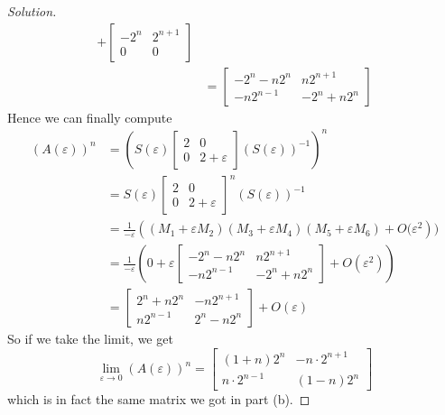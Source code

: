 \documentclass{article}
\newcommand{\ep}{{\varepsilon}}
\begin{document}
\begin{enumerate}
\begin{proof}[Solution]
\begin{align*}
			+ \begin{bmatrix} -2^n & 2^{n+1} \\ 0 & 0 \end{bmatrix}\\
			&= \begin{bmatrix} -2^n-n2^n & n2^{n+1} \\ -n2^{n-1} & -2^n + n2^n \end{bmatrix}
		\end{align*}
		Hence we can finally compute
		\begin{align*}
			(A(\ep))^n
			&= \left(S(\ep)\begin{bmatrix} 2 & 0 \\ 0 & 2 + \ep \end{bmatrix}
			(S(\ep))^{-1}\right)^n\\
			&= S(\ep)\begin{bmatrix} 2 & 0 \\ 0 & 2 + \ep \end{bmatrix}^n
			(S(\ep))^{-1}\\
			&= \frac{1}{-\ep}\left((M_1 + \ep M_2)(M_3 + \ep M_4)(M_5 + \ep M_6) + O(\ep^2\right))\\
			&= \frac{1}{-\ep}\left(0 +
			\ep\begin{bmatrix} -2^n-n2^n & n2^{n+1} \\ -n2^{n-1} & -2^n + n2^n\end{bmatrix}
			+ O(\ep^2)\right)\\
			&= \begin{bmatrix} 2^n+n2^n & -n2^{n+1} \\ n2^{n-1} & 2^n - n2^n\end{bmatrix} + O(\ep)
		\end{align*}
		So if we take the limit, we get
		\[
			\lim_{\ep \to 0}(A(\ep))^n
			= \begin{bmatrix} (1+n)2^n & -n\cdot 2^{n+1} \\ n\cdot2^{n-1} & (1 - n)2^n\end{bmatrix}
		\]
		which is in fact the same matrix we got in part (b).
	\end{proof}
\end{enumerate}
\end{document}
